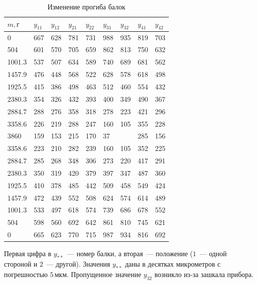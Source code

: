 \begin{table}[!ht]
    \centering
    \caption{Изменение прогиба балок}
    \begin{tabular}{|l|l|l|l|l|l|l|l|l|}
    \hline
        $m,\text{г}$ & $y_{11}$ & $y_{12}$ & $y_{21}$ & $y_{22}$ & $y_{31}$ & $y_{32}$ & $y_{41}$ & $y_{42}$ \\ \hline
        0 & 667 & 628 & 781 & 731 & 988 & 935 & 819 & 703 \\ \hline
        504 & 601 & 570 & 705 & 659 & 862 & 813 & 750 & 632 \\ \hline
        1001.3 & 537 & 507 & 634 & 589 & 740 & 689 & 681 & 562 \\ \hline
        1457.9 & 476 & 448 & 568 & 522 & 628 & 578 & 618 & 498 \\ \hline
        1925.5 & 415 & 386 & 498 & 463 & 512 & 460 & 554 & 432 \\ \hline
        2380.3 & 354 & 326 & 432 & 393 & 400 & 349 & 490 & 367 \\ \hline
        2884.7 & 288 & 276 & 358 & 318 & 278 & 223 & 421 & 296 \\ \hline
        3358.6 & 226 & 219 & 288 & 247 & 160 & 105 & 355 & 228 \\ \hline
        3860 & 159 & 153 & 215 & 170 & 37 & ~ & 285 & 156 \\ \hline
        3358.6 & 223 & 210 & 282 & 239 & 160 & 105 & 352 & 225 \\ \hline
        2884.7 & 285 & 268 & 348 & 306 & 273 & 220 & 417 & 291 \\ \hline
        2380.3 & 350 & 319 & 420 & 379 & 397 & 347 & 487 & 360 \\ \hline
        1925.5 & 410 & 378 & 485 & 442 & 509 & 458 & 549 & 424 \\ \hline
        1457.9 & 472 & 439 & 552 & 508 & 624 & 574 & 614 & 489 \\ \hline
        1001.3 & 533 & 497 & 618 & 574 & 739 & 686 & 678 & 552 \\ \hline
        504 & 598 & 560 & 692 & 642 & 861 & 810 & 745 & 621 \\ \hline
        0 & 665 & 623 & 770 & 715 & 987 & 934 & 816 & 692 \\ \hline
    \end{tabular}
\end{table}
Первая цифра в $y_{**}$~--- номер балки, а вторая~--- положение ($1$~--- одной стороной и
$2$~--- другой). Значения $y_{**}$ даны в десятках микрометров с погрешностью $5\,\text{мкм}$.
Пропущенное значение $y_{32}$ возникло из-за зашкала прибора.

